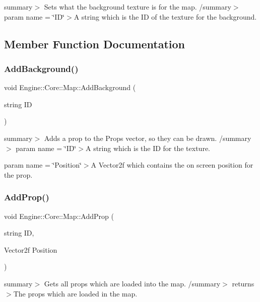 summary$>$ Sets what the background texture is for the map. /summary$>$ param name = \char`\"{}\+I\+D\char`\"{}$>$A string which is the ID of the texture for the background.

\subsection{Member Function Documentation}
\mbox{\label{class_engine_1_1_core_1_1_map_aa81a28822b49c3c7750f0444a189ed8c}} 
\subsubsection{\texorpdfstring{Add\+Background()}{AddBackground()}}
{\footnotesize\ttfamily void Engine\+::\+Core\+::\+Map\+::\+Add\+Background (\begin{DoxyParamCaption}\item[{string}]{ID }\end{DoxyParamCaption})}

summary$>$ Adds a prop to the Props vector, so they can be drawn. /summary$>$ param name = \char`\"{}\+I\+D\char`\"{}$>$A string which is the ID for the texture.

param name = \char`\"{}\+Position\char`\"{}$>$A Vector2f which contains the on screen position for the prop.\mbox{\label{class_engine_1_1_core_1_1_map_aad4517115b5d8713aed2f67338cd7259}} 
\subsubsection{\texorpdfstring{Add\+Prop()}{AddProp()}}
{\footnotesize\ttfamily void Engine\+::\+Core\+::\+Map\+::\+Add\+Prop (\begin{DoxyParamCaption}\item[{string}]{ID,  }\item[{Vector2f}]{Position }\end{DoxyParamCaption})}

summary$>$ Gets all props which are loaded into the map. /summary$>$ returns$>$The props which are loaded in the map.\mbox{\label{class_engine_1_1_core_1_1_map_aea4443f092aabf355e2427fa27605d4d}} 
